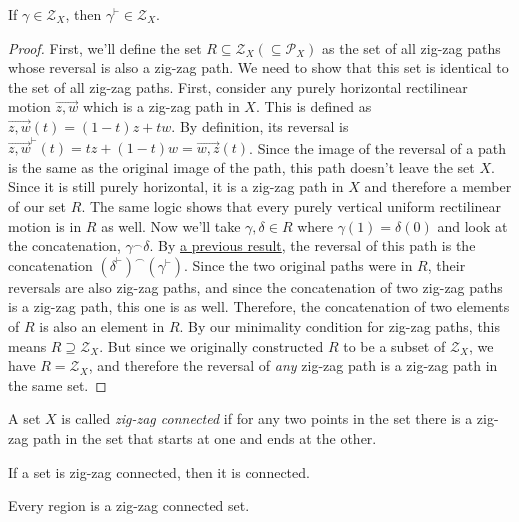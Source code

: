 \begin{theorem}
If $\gamma \in \mathcal{Z}_X$, then $\gamma^\vdash \in \mathcal{Z}_X$.
\end{theorem}
\begin{proof}
First, we'll define the set $R \subseteq \mathcal{Z}_X (\subseteq \mathcal{P}_X)$ as the set of all zig-zag paths whose reversal is also a zig-zag path. We need to show that this set is identical to the set of all zig-zag paths. First, consider any purely horizontal rectilinear motion $\overrightarrow{z,w}$ which is a zig-zag path in $X$. This is defined as $\overrightarrow{z,w}(t) = (1-t)z + tw$. By definition, its reversal is $\overrightarrow{z,w}^\vdash (t) = tz + (1-t)w = \overrightarrow{w,z} (t)$. Since the image of the reversal of a path is the same as the original image of the path, this path doesn't leave the set $X$. Since it is still purely horizontal, it is a zig-zag path in $X$ and therefore a member of our set $R$. The same logic shows that every purely vertical uniform rectilinear motion is in $R$ as well. Now we'll take $\gamma, \delta \in R$ where $\gamma(1) = \delta(0)$ and look at the concatenation, $\gamma^\frown\delta$. By \hyperlink{Reversal of a Concatenation}{a previous result}, the reversal of this path is the concatenation $(\delta^\vdash)^\frown(\gamma^\vdash)$. Since the two original paths were in $R$, their reversals are also zig-zag paths, and since the concatenation of two zig-zag paths is a zig-zag path, this one is as well. Therefore, the concatenation of two elements of $R$ is also an element in $R$. By our minimality condition for zig-zag paths, this means $R\supseteq\mathcal{Z}_X$. But since we originally constructed $R$ to be a subset of $\mathcal{Z}_X$, we have $R=\mathcal{Z}_X$, and therefore the reversal of \emph{any} zig-zag path is a zig-zag path in the same set.
\end{proof}
\begin{definition}
A set $X$ is called \emph{zig-zag connected} if for any two points in the set there is a zig-zag path in the set that starts at one and ends at the other.
\end{definition}
\begin{theorem}
If a set is zig-zag connected, then it is connected.
\end{theorem}
\begin{theorem}
Every region is a zig-zag connected set.
\end{theorem}
